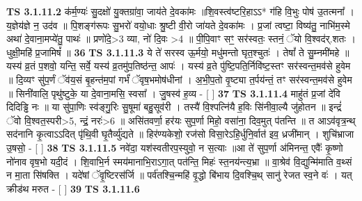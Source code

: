 \documentclass[17pt]{extarticle}
\begin{document}
                  \newline
                                \textbf{ TS 3.1.11.2} \newline
                  क॑र्म॒ण्यः॑ सु॒दक्षो॑ यु॒क्तग्रा॑वा॒ जाय॑ते दे॒वका॑मः ॥शि॒वस्त्व॑ष्टरि॒हाऽऽ* ग॑हि वि॒भुः पोष॑ उ॒तत्मना᳚ । य॒ज्ञेय॑ज्ञे न॒ उद॑व ॥ पि॒शङ्ग॑रूपः सु॒भरो॑ वयो॒धाः श्रु॒ष्टी वी॒रो जा॑यते दे॒वका॑मः । प्र॒जां त्वष्टा॒ विष्य॑तु॒ नाभि॑म॒स्मे अथा॑ दे॒वाना॒मप्ये॑तु॒ पाथः॑ ॥ प्रणो॑दे॒>3 व्या, नो॑ दि॒वः >4 ॥ पी॒पि॒वाꣳ सꣳ॒॒ सर॑स्वतः॒ स्तनं॒ ॅयो वि॒श्वद॑र्.शतः । धुक्षी॒महि॑ प्र॒जामिषं᳚ ॥ \textbf{  36} \newline
                  \newline
                                \textbf{ TS 3.1.11.3} \newline
                  ये ते॑ सरस्व ऊ॒र्मयो॒ मधु॑मन्तो घृत॒श्चुतः॑ । तेषां᳚ ते सु॒म्नमी॑महे ॥ यस्य॑ व्र॒तं प॒शवो॒ यन्ति॒ सर्वे॒ यस्य॑ व्र॒तमु॑प॒तिष्ठ॑न्त॒ आपः॑ । यस्य॑ व्र॒ते पु॑ष्टि॒पति॒र्निवि॑ष्ट॒स्तꣳ सर॑स्वन्त॒मव॑से हुवेम ॥ दि॒व्यꣳ सु॑प॒र्णं ॅव॑य॒सं बृ॒हन्त॑म॒पां गर्भं॑ ॅवृष॒भमोष॑धीनां । अ॒भी॒प॒तो वृ॒ष्ट्या त॒र्पय॑न्तं॒ तꣳ सर॑स्वन्त॒मव॑से हुवेम ॥ सिनी॑वालि॒ पृथु॑ष्टुके॒ या दे॒वाना॒मसि॒ स्वसा᳚ । जु॒षस्व॑ ह॒व्य - [  ] \textbf{  37} \newline
                  \newline
                                \textbf{ TS 3.1.11.4} \newline
                  माहु॑तं प्र॒जां दे॑वि दिदिड्ढि नः ॥ या सु॑पा॒णिः स्व॑ङ्गु॒रिः सु॒षूमा॑ बहु॒सूव॑री । तस्यै॑ वि॒श्पत्नि॑यै ह॒विः सि॑नीवा॒ल्यै जु॑होतन ॥ इन्द्रं॑ ॅवो वि॒श्वत॒स्परी>5, न्द्रं॒ नरः॑>6 ॥ असि॑तवर्णा॒ हर॑यः सुप॒र्णा मिहो॒ वसा॑ना॒ दिव॒मुत् प॑तन्ति ॥ त आऽव॑वृत्र॒न्थ् सद॑नानि कृ॒त्वाऽऽदित् पृ॑थि॒वी घृ॒तैर्व्यु॑द्यते ॥ हिर॑ण्यकेशो॒ रज॑सो विसा॒रेऽहि॒र्धुनि॒र्वात॑ इव॒ ध्रजी॑मान् । शुचि॑भ्राजा उ॒षसो॒ - [  ] \textbf{  38} \newline
                  \newline
                                \textbf{ TS 3.1.11.5} \newline
                  नवे॑दा॒ यश॑स्वतीरप॒स्युवो॒ न स॒त्याः ॥आ ते॑ सुप॒र्णा अ॑मिनन्त॒ एवैः᳚ कृ॒ष्णो नो॑नाव वृष॒भो यदी॒दं । शि॒वाभि॒र्न स्मय॑मानाभि॒राऽगा॒त् पत॑न्ति॒ मिहः॑ स्त॒नय॑न्त्य॒भ्रा ॥ वा॒श्रेव॑ वि॒द्युन्मि॑माति व॒थ्सं न मा॒ता सि॑षक्ति । यदे॑षां ॅवृ॒ष्टिरस॑र्जि ॥ पर्व॑तश्चि॒न्महि॑ वृ॒द्धो बि॑भाय दि॒वश्चि॒थ् सानु॑ रेजत स्व॒ने वः॑ । यत् क्रीड॑थ मरुत - [  ] \textbf{  39} \newline
                  \newline
                                \textbf{ TS 3.1.11.6} \newline
\end{document}
